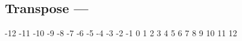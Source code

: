 \subsection[Transpose]{Transpose --- \UiKey{\SET}}





























-12
-11
-10
-9
-8
-7
-6
-5
-4
-3
-2
-1
0
1
2
3
4
5
6
7
8
9
10
11
12
